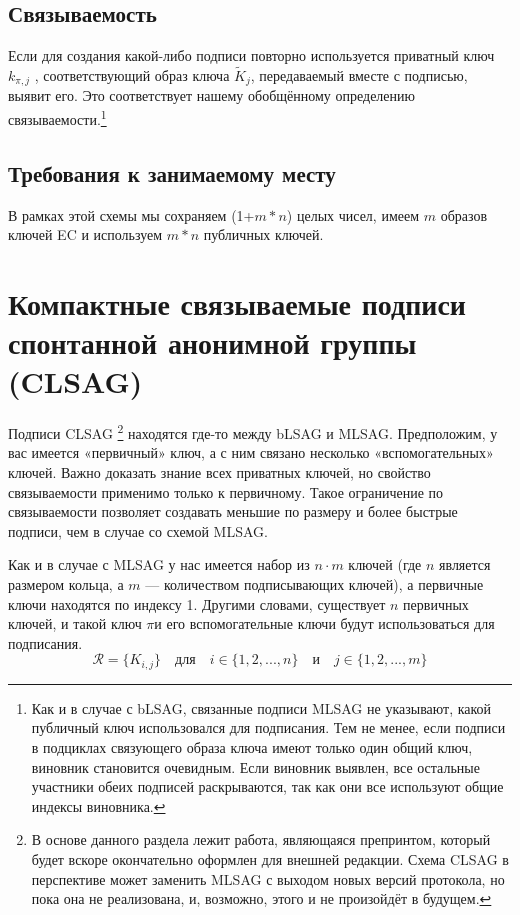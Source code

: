 \subsection*{Связываемость}

Если для создания какой-либо подписи повторно используется приватный ключ \(k_{\pi, j}\) , соответ\-ствующий образ ключа \(\tilde{K}_j\), передаваемый вместе с подписью, выявит его. Это соответствует нашему обобщённому определению связываемости.\footnote{Как и в случае с bLSAG, связанные подписи MLSAG не указывают, какой публичный ключ использовался для подписания. Тем не менее, если подписи в подциклах связующего образа ключа имеют только один общий ключ, виновник становится очевидным. Если виновник выявлен, все остальные участники обеих подписей раскрываются, так как они все используют общие индексы виновника.}


\subsection*{Требования к занимаемому месту}

В рамках этой схемы мы сохраняем (1+$m*n$) целых чисел, имеем $m$ образов ключей EC и используем $m*n$ публичных ключей.



\section{Компактные  связываемые подписи спонтанной анонимной группы (CLSAG)}
\label{sec:CLSAG}

Подписи CLSAG \cite{MRL-0011-CLSAG}\footnote{В основе данного раздела лежит работа, являющаяся препринтом, который будет вскоре окончательно оформлен для внешней редакции. Схема CLSAG в перспективе может заменить MLSAG с выходом новых версий протокола, но пока она не реализована, и, возможно, этого и не произойдёт в будущем.} находятся где-то между bLSAG и MLSAG. Предположим, у вас имеется «первичный» ключ, а с ним связано несколько «вспомогательных» ключей. Важно доказать знание всех приватных ключей, но свойство связываемости применимо только к первичному. Такое ограничение по связываемости позволяет создавать меньшие по размеру и более бы\-стрые подписи, чем в случае со схемой MLSAG.

Как и в случае с MLSAG у нас имеется набор из \(n \cdot m\) ключей (где $n$ является размером кольца, а $m$ — количеством подписывающих ключей), а первичные ключи находятся по индексу 1. Другими словами, существует $n$ первичных ключей, и такой ключ $\pi$\nth и его вспомогательные ключи будут использоваться для подписания.\vspace{.175cm}
\[\mathcal{R} = \{K_{i,j}\}  \quad \textrm{для} \quad  i \in \{1, 2, ..., n\} \quad \textrm{и} \quad j \in \{1, 2, ..., m\}\]

